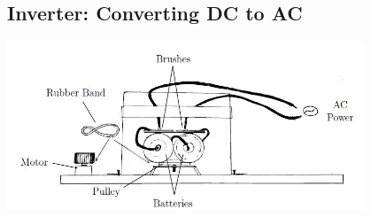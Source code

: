 \subsection{Inverter: Converting DC to AC} \label{sub:inverter}  

\begin{center}
\includegraphics[width=0.8\textwidth]{./img/inverter-2.jpg}
\end{center}

